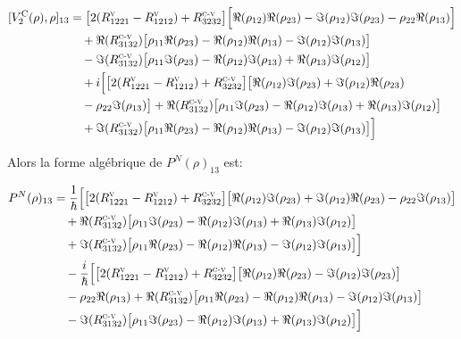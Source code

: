 \documentclass[12pt,a4paper,openany,oneside]{book}
\begin{document}
{{{{{{\begin{eqnarray*}
\begin{split}
[V_{2}^{\textrm{C}}(\rho),\rho]_{13} &= \big[2(R^{\textsc{v}}_{1221}-R^{\textsc{v}}_{1212})+R^{\textsc{c-v}}_{3232}\big]\Big[\Re(\rho_{12})\Re(\rho_{23})-\Im(\rho_{12})\Im(\rho_{23})-\rho_{22}\Re(\rho_{13})\Big]\\
&\quad + \Re(R^{\textsc{c-v}}_{3132})\big[\rho_{11}\Re(\rho_{23})-\Re(\rho_{12})\Re(\rho_{13})-\Im(\rho_{12})\Im(\rho_{13})\big]\\
&\quad -\Im(R^{\textsc{c-v}}_{3132})\big[\rho_{11}\Im(\rho_{23})-\Re(\rho_{12})\Im(\rho_{13})+\Re(\rho_{13})\Im(\rho_{12})\big]\\ 
&\quad +i\Big[\big[2(R^{\textsc{v}}_{1221}-R^{\textsc{v}}_{1212})+R^{\textsc{c-v}}_{3232}\big]\big[\Re(\rho_{12})\Im(\rho_{23})+\Im(\rho_{12})\Re(\rho_{23})\\
&\quad -\rho_{22}\Im(\rho_{13})\big] +\Re(R^{\textsc{c-v}}_{3132})\big[\rho_{11}\Im(\rho_{23})-\Re(\rho_{12})\Im(\rho_{13})+\Re(\rho_{13})\Im(\rho_{12})\big]\\
&\quad + \Im(R^{\textsc{c-v}}_{3132})\big[\rho_{11}\Re(\rho_{23})-\Re(\rho_{12})\Re(\rho_{13})-\Im(\rho_{12})\Im(\rho_{13})\big]\Big]\\
\end{split}
\end{eqnarray*}


Alors la forme algébrique de $ P^{N}(\rho)_{13}$ est:

\begin{eqnarray*}
\begin{split}
P^{N}(\rho)_{13}&= \dfrac{1}{\hbar}\Big[\big[2(R^{\textsc{v}}_{1221}-R^{\textsc{v}}_{1212})+R^{\textsc{c-v}}_{3232}\big]\big[\Re(\rho_{12})\Im(\rho_{23})+\Im(\rho_{12})\Re(\rho_{23})-\rho_{22}\Im(\rho_{13})\big]\\
&\quad +\Re(R^{\textsc{c-v}}_{3132})\big[\rho_{11}\Im(\rho_{23})-\Re(\rho_{12})\Im(\rho_{13})+\Re(\rho_{13})\Im(\rho_{12})\big]\\
&\quad + \Im(R^{\textsc{c-v}}_{3132})\big[\rho_{11}\Re(\rho_{23})-\Re(\rho_{12})\Re(\rho_{13})-\Im(\rho_{12})\Im(\rho_{13})\big]\Big]\\
 &\quad -\dfrac{i}{\hbar}\Big[\big[2(R^{\textsc{v}}_{1221}-R^{\textsc{v}}_{1212})+R^{\textsc{c-v}}_{3232}\big]\big[\Re(\rho_{12})\Re(\rho_{23})-\Im(\rho_{12})\Im(\rho_{23})\big]\\
&\quad -\rho_{22}\Re(\rho_{13})+ \Re(R^{\textsc{c-v}}_{3132})\big[\rho_{11}\Re(\rho_{23})-\Re(\rho_{12})\Re(\rho_{13})-\Im(\rho_{12})\Im(\rho_{13})\big]\\
&\quad -\Im(R^{\textsc{c-v}}_{3132})\big[\rho_{11}\Im(\rho_{23})-\Re(\rho_{12})\Im(\rho_{13})+\Re(\rho_{13})\Im(\rho_{12})\big]\Big]
\end{split}
\end{eqnarray*}


}}}}}}
\end{document}
